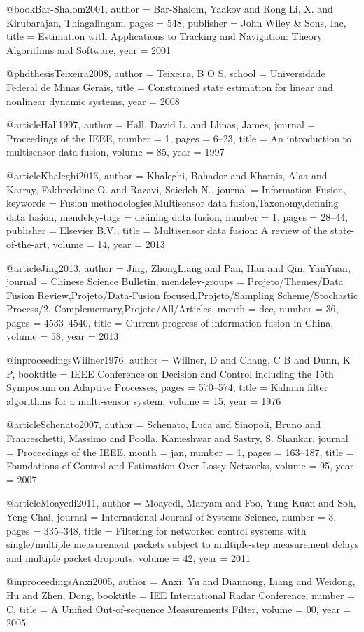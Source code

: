 @book{Bar-Shalom2001,
author = {Bar-Shalom, Yaakov and {Rong Li}, X. and Kirubarajan, Thiagalingam},
pages = {548},
publisher = {John Wiley {\&} Sons, Inc},
title = {{Estimation with Applications to Tracking and Navigation: Theory Algorithms and Software}},
year = {2001}
}

@phdthesis{Teixeira2008,
author = {Teixeira, B O S},
school = {Universidade Federal de Minas Gerais},
title = {{Constrained state estimation for linear and nonlinear dynamic systems}},
year = {2008}
}

@article{Hall1997,
author = {Hall, David L. and Llinas, James},
journal = {Proceedings of the IEEE},
number = {1},
pages = {6--23},
title = {{An introduction to multisensor data fusion}},
volume = {85},
year = {1997}
}

@article{Khaleghi2013,
author = {Khaleghi, Bahador and Khamis, Alaa and Karray, Fakhreddine O. and Razavi, Saiedeh N.},
journal = {Information Fusion},
keywords = {Fusion methodologies,Multisensor data fusion,Taxonomy,defining data fusion},
mendeley-tags = {defining data fusion},
number = {1},
pages = {28--44},
publisher = {Elsevier B.V.},
title = {{Multisensor data fusion: A review of the state-of-the-art}},
volume = {14},
year = {2013}
}

@article{Jing2013,
author = {Jing, ZhongLiang and Pan, Han and Qin, YanYuan},
journal = {Chinese Science Bulletin},
mendeley-groups = {Projeto/Themes/Data Fusion Review,Projeto/Data-Fusion focused,Projeto/Sampling Scheme/Stochastic Process/2. Complementary,Projeto/All/Articles},
month = {dec},
number = {36},
pages = {4533--4540},
title = {{Current progress of information fusion in China}},
volume = {58},
year = {2013}
}


@inproceedings{Willner1976,
author = {Willner, D and Chang, C B and Dunn, K P},
booktitle = {IEEE Conference on Decision and Control including the 15th Symposium on Adaptive Processes},
pages = {570--574},
title = {{Kalman filter algorithms for a multi-sensor system}},
volume = {15},
year = {1976}
}

@article{Schenato2007,
author = {Schenato, Luca and Sinopoli, Bruno and Franceschetti, Massimo and Poolla, Kameshwar and Sastry, S. Shankar},
journal = {Proceedings of the IEEE},
month = {jan},
number = {1},
pages = {163--187},
title = {{Foundations of Control and Estimation Over Lossy Networks}},
volume = {95},
year = {2007}
}



@article{Moayedi2011,
author = {Moayedi, Maryam and Foo, Yung Kuan and Soh, Yeng Chai},
journal = {International Journal of Systems Science},
number = {3},
pages = {335--348},
title = {{Filtering for networked control systems with single/multiple measurement packets subject to multiple-step measurement delays and multiple packet dropouts}},
volume = {42},
year = {2011}
}

@inproceedings{Anxi2005,
author = {Anxi, Yu and Diannong, Liang and Weidong, Hu and Zhen, Dong},
booktitle = {IEE International Radar Conference},
number = {C},
title = {{A Unified Out-of-sequence Measurements Filter}},
volume = {00},
year = {2005}
}

